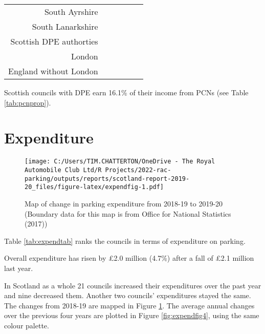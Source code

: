 \documentclass[
  12pt,
]{article}
\begin{document}
\begin{longtable}[t]{rrrrrr}
South Ayrshire & \cellcolor{white}{} & \cellcolor{white}{16.7\%} & \cellcolor{white}{21.8\%} & \cellcolor{white}{22.3\%} & \cellcolor{white}{40.4\%}\\
South Lanarkshire & \cellcolor{white}{30.3\%} & \cellcolor{white}{32.1\%} & \cellcolor{white}{30.7\%} & \cellcolor{white}{31.5\%} & \cellcolor{white}{32.2\%}\\
Scottish DPE authorties & \cellcolor{white}{19.0\%} & \cellcolor{white}{20.0\%} & \cellcolor{white}{20.0\%} & \cellcolor{white}{20.0\%} & \cellcolor{white}{20.6\%}\\
London & \cellcolor{white}{49.3\%} & \cellcolor{white}{42.0\%} & \cellcolor{white}{43.1\%} & \cellcolor{white}{45.1\%} & \cellcolor{white}{}\\
England without London & \cellcolor{white}{11.5\%} & \cellcolor{white}{12.8\%} & \cellcolor{white}{13.8\%} & \cellcolor{white}{12.3\%} & \cellcolor{white}{}\\*
\end{longtable}
\endgroup{}

Scottish councils with DPE earn 16.1\% of their income from PCNs (see Table \ref{tab:pcnprop}).

\hypertarget{expenditure}{%
\section{Expenditure}\label{expenditure}}

\begin{figure}
\centering
\texttt{[image: C:/Users/TIM.CHATTERTON/OneDrive - The Royal Automobile Club Ltd/R Projects/2022-rac-parking/outputs/reports/scotland-report-2019-20\_files/figure-latex/expendfig-1.pdf]}
\caption{\label{fig:expendfig}Map of change in parking expenditure from 2018-19 to 2019-20 (Boundary data for this map is from Office for National Statistics (2017))}
\end{figure}

Table \ref{tab:expendtab} ranks the councils in terms of expenditure on parking.

Overall expenditure has risen by £2.0 million (4.7\%) after a fall of £2.1 million last year.

In Scotland as a whole 21 councils increased their expenditures over the past year and nine decreased them. Another two councils' expenditures stayed the same. The changes from 2018-19 are mapped in Figure \ref{fig:expendfig}. The average annual changes over the previous four years are plotted in Figure \ref{fig:expendfig4}, using the same colour palette.
\end{document}
